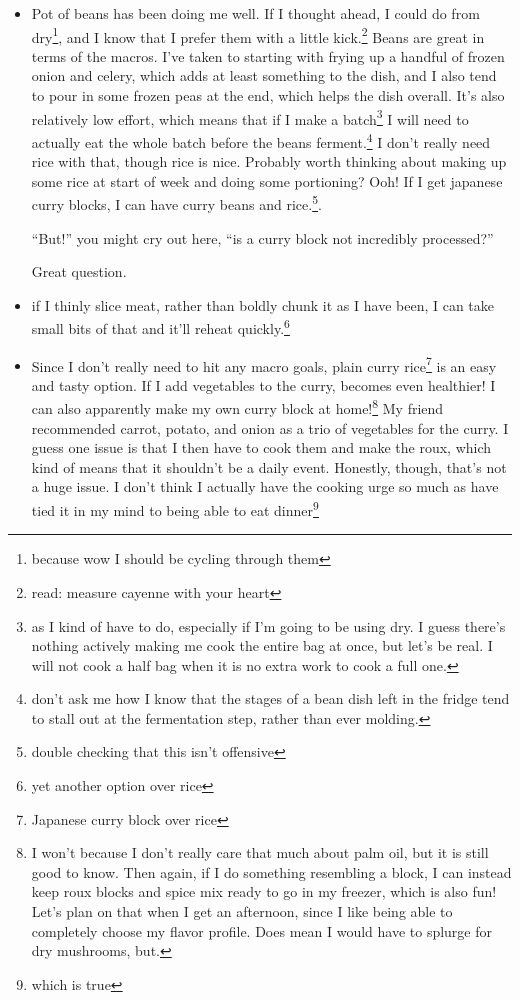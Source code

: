\documentclass[12pt]{article}[titlepage]
\newcommand{\say}[1]{``#1''}
\renewcommand{\,}{\textsuperscript{,}}
\begin{document}
\begin{itemize}

\item Pot of beans has been doing me well. If I thought ahead, I could do from dry\footnote{because wow I should be cycling through them}, and I know that I prefer them with a little kick.\footnote{read: measure cayenne with your heart}  
Beans are great in terms of the macros.  
I've taken to starting with frying up a handful of frozen onion and celery, which adds at least something to the dish, and I also tend to pour in some frozen peas at the end, which helps the dish overall.  
It's also relatively low effort, which means that if I make a batch\footnote{as I kind of have to do, especially if I'm going to be using dry. I guess there's nothing actively making me cook the entire bag at once, but let's be real. I will not cook a half bag when it is no extra work to cook a full one.} I will need to actually eat the whole batch before the beans ferment.\footnote{don't ask me how I know that the stages of a bean dish left in the fridge tend to stall out at the fermentation step, rather than ever molding.}  
I don't really need rice with that, though rice is nice. Probably worth thinking about making up some rice at start of week and doing some portioning?  
Ooh! If I get japanese curry blocks, I can have curry beans and rice.\footnote{double checking that this isn't offensive}.

\say{But!} you might cry out here, \say{is a curry block not incredibly processed?}

Great question.

\item if I thinly slice meat, rather than boldly chunk it as I have been, I can take small bits of that and it'll reheat quickly.\footnote{yet another option over rice}

\item Since I don't really need to hit any macro goals, plain curry rice\footnote{Japanese curry block over rice} is an easy and tasty option.  
If I add vegetables to the curry, becomes even healthier!  
I can also apparently make my own curry block at home!\footnote{I won't because I don't really care that much about palm oil, but it is still good to know. Then again, if I do something resembling a block, I can instead keep roux blocks and spice mix ready to go in my freezer, which is also fun! Let's plan on that when I get an afternoon, since I like being able to completely choose my flavor profile. Does mean I would have to splurge for dry mushrooms, but.}  
My friend recommended carrot, potato, and onion as a trio of vegetables for the curry.  
I guess one issue is that I then have to cook them and make the roux, which kind of means that it shouldn't be a daily event.  
Honestly, though, that's not a huge issue. I don't think I actually have the cooking urge so much as have tied it in my mind to being able to eat dinner\footnote{which is true}

\end{itemize}
\end{document}
